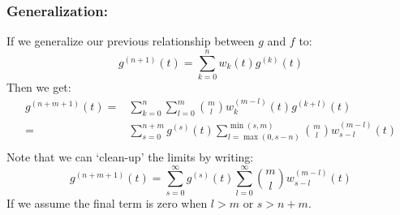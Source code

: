 \subsubsection{Generalization:}
If we generalize our previous relationship between $g$ and $f$ to:
\[g^{(n+1)}(t) = \sum_{k=0}^nw_k(t)g^{(k)}(t)\]
Then we get:
\[\begin{aligned}
	g^{(n+m+1)}(t)=&\sum_{k=0}^n\sum_{l=0}^m\binom{m}{l}w_k^{(m-l)}(t)g^{(k+l)}(t)\\
	=&\sum_{s=0}^{n+m}g^{(s)}(t)\sum_{l=\max(0,s-n)}^{\min(s,m)}\binom{m}{l}w_{s-l}^{(m-l)}(t)\\
\end{aligned}\]
Note that we can `clean-up' the limits by writing:
\[g^{(n+m+1)}(t)=\sum_{s=0}^{\infty}g^{(s)}(t)\sum_{l=0}^{\infty}\binom{m}{l}w_{s-l}^{(m-l)}(t)\]
If we assume the final term is zero when $l>m$ or $s>n+m$.

